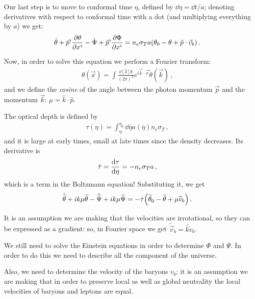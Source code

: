 \documentclass[main.tex]{subfiles}
\begin{document}
Our last step is to move to conformal time \(\eta \), defined by \(\dd{\eta } = \dd{t} / a\); denoting derivatives with respect to conformal time with a dot (and multiplying everything by \(a\)) we get: 
%
\begin{align}
\dot{\theta} + \hat{p}^{i} \pdv{\theta }{x^{i}}
- \dot{\Psi} + \hat{p}^{i} \pdv{\Phi }{x^{i}}
= n_e \sigma_{T} a \qty(\theta_0 - \theta + \hat{p} \cdot \vec{v}_b)
\,.
\end{align}
 
Now, in order to solve this equation we perform a Fourier transform: 
%
\begin{align}
\theta (\vec{x}) = 
\int \frac{ \dd[3]{k}}{(2\pi )^3} e^{i \vec{k} \cdot \vec{x}}
\widetilde{\theta} (\vec{k})
\,,
\end{align}
%
and we define the \emph{cosine} of the angle between the photon momentum \(\vec{p}\) and the momentum \(\vec{k}\): \(\mu = \hat{k} \cdot \hat{p}\). 

The optical depth is defined by 
%
\begin{align}
\tau (\eta )
= \int_{\eta }^{\eta_0 } \dd{\overline{\eta}}a(\overline{\eta})
n_e \sigma_{T} 
\,,
\end{align}
%
and it is large at early times, small at late times since the density decreases. Its derivative is 
%
\begin{align}
\dot{\tau} = \dv{\tau }{\eta } = - n_e \sigma_{T} a 
\,,
\end{align}
%
which is a term in the Boltzmann equation! Substituting it, we get 
%
\begin{align}
\dot{\widetilde{\theta}} + ik \mu \widetilde{\theta}
- \dot{\widetilde{\Psi}} + ik \mu \widetilde{\Psi}
=- \dot{\tau}\qty(\widetilde{\theta}_0 - \widetilde{\theta} + \mu \widetilde{v}_b)
\,.
\end{align}

It is an assumption we are making that the velocities are irrotational, so they can be expressed as a gradient: so, in Fourier space we get \(\widetilde{\vec{v}}_{b} = \hat{k} \widetilde{v}_b\). 

We still need to solve the Einstein equations in order to determine \(\Phi \) and \(\Psi \). In order to do this we need to describe all the component of the universe.

Also, we need to determine the velocity of the baryons \(v_b\); it is an assumption we are making that in order to preserve local as well as global neutrality the local velocities of baryons and leptons are equal. 
\end{document}
